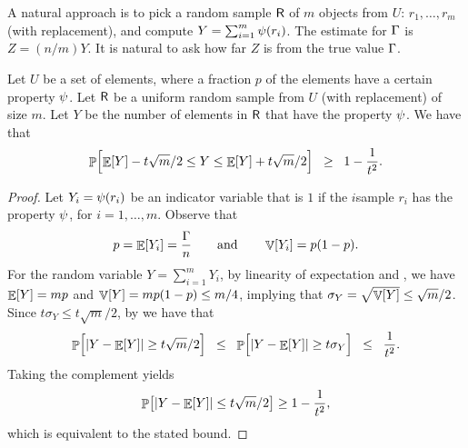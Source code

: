 A natural approach is to pick a random sample $\mathsf{R}$ of $m$ objects
from $U$: $r_1, \ldots, r_m$ (with replacement), and compute
$Y = \sum_{i=1}^m \propertyX{r_i}$.  The estimate for $\Gamma$ is
$Z = (n/m) Y$. It is natural to ask how far $Z$ is from the true value
$\Gamma$.


\begin{lemma}
    Let $U$ be a set of elements, where a fraction $p$ of the elements
    have a certain property $\psi$. Let $\mathsf{R}$ be a uniform
    random sample from $U$ (with replacement) of size $m$. Let $Y$ be the
    number of elements in $\mathsf{R}$ that have the property
    $\psi$. We have that
    \begin{equation*}
        \Prob{ \Bigl. \Ex{Y} - t \sqrt{m}/2 \leq Y \leq \Ex{Y} + t \sqrt{m}/2
        } \GEQ 1- \frac{1}{t^2}.
    \end{equation*}
\end{lemma}
\begin{proof}
    Let $Y_i = \propertyX{r_i}$ be an indicator variable that is $1$ if
    the $i$\th sample $r_i$ has the property $\psi$, for
    $i=1,\ldots, m$.  Observe that
    \begin{equation*}
        p = \mathop{\mathbb{E}}\!\left[ {Y_i} \right] = \frac{\Gamma}{n}
        \qquad\text{and}\qquad
        \mathop{\mathbb{V}}\!\left[ {Y_i} \right] = p(1-p).        
    \end{equation*}
    For the random variable $Y = \sum_{i=1}^m Y_i$, by linearity of
    expectation and , we have $\mathop{\mathbb{E}}\!\left[ {Y} \right] = mp$ and
    $\mathop{\mathbb{V}}\!\left[ {Y} \right] = m p (1-p) \leq m/4$, implying that
    $\sigma_Y = \sqrt{\mathop{\mathbb{V}}\!\left[ {Y} \right]} \leq \sqrt{m}/2$. Since
    $t \sigma_Y \leq t \sqrt{m}/2$, by  we have that
    \begin{equation*}
        \Prob{ \cardin{Y - \Ex{Y}} \geq t \sqrt{m}/2
           \Bigr.
        }
        \LEQ
        \Prob{\Bigl. \cardin{Y - \Ex{Y}} \geq t \sigma_Y}
        \LEQ
        \frac{1}{t^2}.
    \end{equation*}
    Taking the complement yields
    \begin{equation*}
        \Prob{ \cardin{Y - \Ex{Y}} \leq t \sqrt{m}/2 } \geq 1 - \frac{1}{t^2},
    \end{equation*}
    which is equivalent to the stated bound.
\end{proof}

